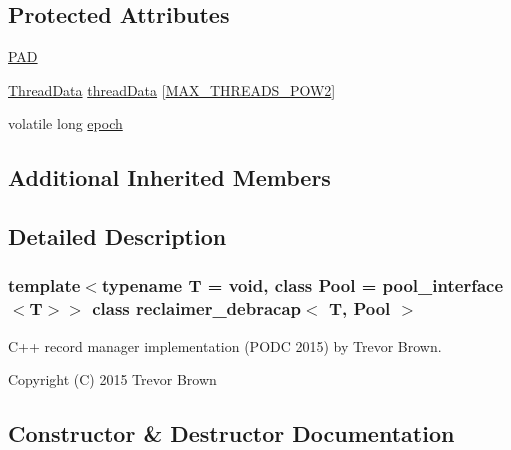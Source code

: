 \subsection*{Protected Attributes}
\begin{DoxyCompactItemize}
\item 
\hyperlink{classreclaimer__debracap_a558831a56d3365af4684bd49307a75cc}{P\+AD}
\item 
\hyperlink{classreclaimer__debracap_1_1ThreadData}{Thread\+Data} \hyperlink{classreclaimer__debracap_a3850a9ce45071232e789ea24d8c0c9df}{thread\+Data} \mbox{[}\hyperlink{plaf_8h_ac1585a3455dd3e33e877e588be9e466b}{M\+A\+X\+\_\+\+T\+H\+R\+E\+A\+D\+S\+\_\+\+P\+O\+W2}\mbox{]}
\item 
volatile long \hyperlink{classreclaimer__debracap_ad3bcf7f4ebbdbcab522af7f5b0447cb5}{epoch}
\end{DoxyCompactItemize}
\subsection*{Additional Inherited Members}


\subsection{Detailed Description}
\subsubsection*{template$<$typename T = void, class Pool = pool\+\_\+interface$<$\+T$>$$>$\newline
class reclaimer\+\_\+debracap$<$ T, Pool $>$}

C++ record manager implementation (P\+O\+DC 2015) by Trevor Brown.

Copyright (C) 2015 Trevor Brown 

\subsection{Constructor \& Destructor Documentation}
\mbox{\label{classreclaimer__debracap_a3528489fe624bf72f5b6ebae79279fd4}} 
